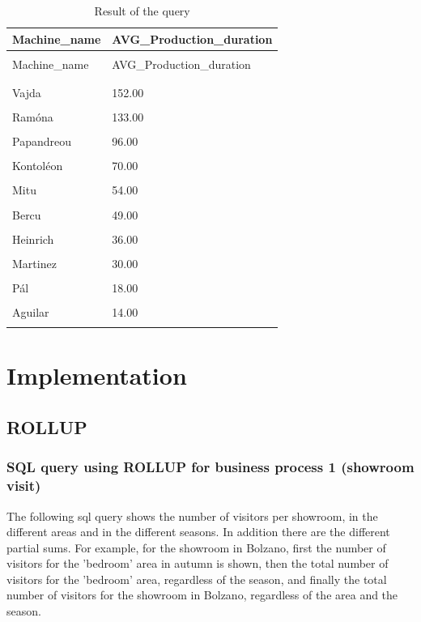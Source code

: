 \documentclass[letterpaper,12pt]{article}
\begin{document}
\begingroup
\renewcommand\arraystretch{0.5}
\begin{longtable}{p{3cm}p{4cm}}
        \caption{Result of the query} \\
        Machine\_name & AVG\_Production\_duration \\
        \endfirsthead \\
        Machine\_name & AVG\_Production\_duration \\
        \endhead \\
        \hline \\
        Vajda & 152.00 \\
        \hline \\
        \color{red} Ramóna & 133.00 \\
        \hline \\
        Papandreou & 96.00 \\
        \hline \\
        Kontoléon & 70.00 \\
        \hline \\
        Mitu & 54.00 \\
        \hline \\
        Bercu & 49.00 \\
        \hline \\
        Heinrich & 36.00 \\
        \hline \\
        Martinez & 30.00 \\
        \hline \\
        Pál & 18.00 \\
        \hline \\
        Aguilar & 14.00 \\
        \hline \\
\end{longtable} 
\endgroup

\section{Implementation}
\subsection{ROLLUP}
\subsubsection{SQL query using ROLLUP for business process 1 (showroom visit)}

The following sql query shows the number of visitors per showroom, in the different areas and in the different seasons. In addition there are the different partial sums. For example, for the showroom in Bolzano, first the number of visitors for the 'bedroom' area in autumn is shown, then the total number of visitors for the 'bedroom' area, regardless of the season, and finally the total number of visitors for the showroom in Bolzano, regardless of the area and the season.
\end{document}
